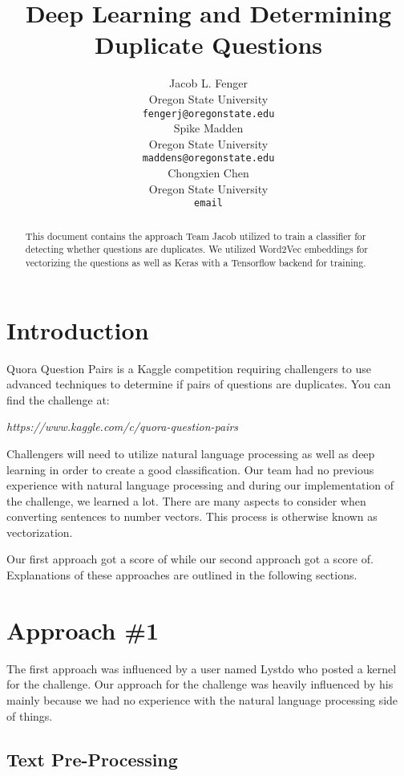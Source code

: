\documentclass{article}
\title{Deep Learning and Determining Duplicate Questions}
\author{
  Jacob L. Fenger\\
  Oregon State University\\
  \texttt{fengerj@oregonstate.edu} \\
  \And
  Spike Madden \\
  Oregon State University\\
  \texttt{maddens@oregonstate.edu} \\
  \AND
  Chongxien Chen \\
  Oregon State University\\
  \texttt{email} \\
}
\begin{document}

\maketitle

\begin{abstract}
  This document contains the approach Team Jacob utilized to train a classifier
  for detecting whether questions are duplicates. We utilized Word2Vec embeddings
  for vectorizing the questions as well as Keras with a Tensorflow backend
  for training.
\end{abstract}

\section{Introduction}

Quora Question Pairs is a Kaggle competition requiring challengers to use
advanced techniques to determine if pairs of questions are duplicates. You
can find the challenge at:
\begin{center}
\textit{https://www.kaggle.com/c/quora-question-pairs}
\end{center}

Challengers will need to utilize natural language processing as well as
deep learning in order to create a good classification. Our team had no
previous experience with natural language processing and during our
implementation of the challenge, we learned a lot. There are many aspects
to consider when converting sentences to number vectors. This process is
otherwise known as vectorization.

Our first approach got a score of  while our second approach got a score
of. Explanations of these approaches are outlined in the following
sections.

\section{Approach \#1}

The first approach was influenced by a user named Lystdo who posted a kernel
for the challenge. Our approach for the challenge was heavily influenced by
his mainly because we had no experience with the natural language processing
side of things.

\subsection{Text Pre-Processing}
\end{document}
